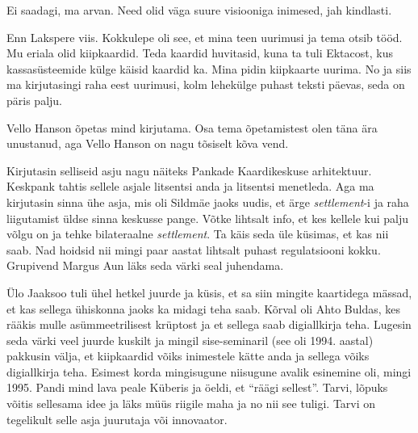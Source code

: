 Ei saadagi, ma arvan. Need olid väga suure visiooniga inimesed, jah kindlasti. 


Enn Lakspere viis. Kokkulepe oli see, et  mina teen uurimusi ja tema otsib 
tööd. Mu eriala olid kiipkaardid. Teda kaardid huvitasid, kuna ta tuli Ektacost, kus kassasüsteemide külge käisid kaardid ka. Mina pidin  kiipkaarte uurima. No ja siis ma 
kirjutasingi raha eest uurimusi, kolm lehekülge puhast teksti 
päevas, seda on päris palju.

Vello Hanson õpetas mind kirjutama. Osa tema 
õpetamistest olen täna ära unustanud, aga Vello Hanson on nagu tõsiselt kõva 
vend. 

Kirjutasin selliseid asju nagu näiteks Pankade Kaardikeskuse arhitektuur. Keskpank tahtis sellele asjale litsentsi anda ja 
litsentsi menetleda. Aga ma kirjutasin sinna  ühe asja, mis oli 
Sildmäe jaoks uudis, et ärge \emph{settlement}-i ja raha liigutamist üldse sinna 
keskusse pange. Võtke lihtsalt info, et kes kellele kui palju võlgu on ja tehke 
bilateraalne \emph{settlement}. Ta käis seda üle küsimas, et 
kas nii saab. Nad hoidsid nii mingi paar aastat  
lihtsalt puhast regulatsiooni kokku. Grupivend Margus Aun 
läks seda värki seal juhendama. 

Ülo Jaaksoo tuli  ühel hetkel juurde ja küsis, et sa siin mingite 
kaartidega mässad, et  kas sellega ühiskonna jaoks ka midagi teha saab. Kõrval 
oli Ahto Buldas, kes rääkis mulle asümmeetrilisest 
krüptost ja et sellega saab digiallkirja teha. Lugesin seda värki veel juurde 
kuskilt ja mingil sise-seminaril (see oli 1994. aastal) pakkusin välja, et 
kiipkaardid võiks inimestele kätte anda ja sellega võiks digiallkirja teha. 
Esimest korda mingisugune niisugune avalik esinemine oli, mingi 1995. Pandi 
mind lava peale Küberis ja öeldi, et \enquote{räägi sellest}. 
Tarvi, lõpuks võitis sellesama idee ja läks müüs 
riigile maha ja no nii see tuligi. Tarvi on tegelikult selle asja juurutaja 
või innovaator.

                 
